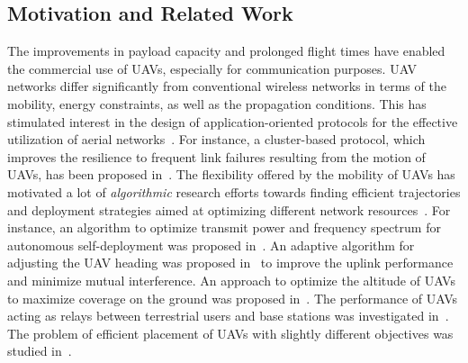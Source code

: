 \documentclass[journal,draftclsnofoot,onecolumn,12pt]{IEEEtran}
\begin{document}
\subsection{Motivation and Related Work} 
The improvements in payload capacity and prolonged flight times have enabled the commercial use of UAVs, especially for communication purposes. UAV networks differ significantly from conventional wireless networks in terms of the mobility, energy constraints, as well as the propagation conditions. This has stimulated interest in the design of application-oriented protocols for the effective utilization of aerial networks~\cite{sur1,sur2,sur3}. For instance, a cluster-based protocol, which improves the resilience to frequent link failures resulting from the motion of UAVs, has been proposed in~\cite{sur2}. The flexibility offered by the mobility of UAVs has motivated a lot of {\em algorithmic} research efforts towards finding efficient trajectories and deployment strategies aimed at optimizing different network resources~\cite{belllabs,optuplink,optimallap,wirelessRelay,mohmdl,halim,UAVpath}. For instance, an algorithm to optimize transmit power and frequency spectrum for autonomous self-deployment was proposed in~\cite{belllabs}. An adaptive algorithm for adjusting the UAV heading was proposed in~\cite{optuplink} to improve the uplink performance and minimize mutual interference. An approach to optimize the altitude of UAVs to maximize coverage on the ground was proposed in~\cite{optimallap}. The performance of UAVs acting as relays between terrestrial users and base stations was investigated in~\cite{wirelessRelay}. The problem of efficient placement of UAVs with slightly different objectives was studied in~\cite{mohmdl,halim}.

\end{document}
